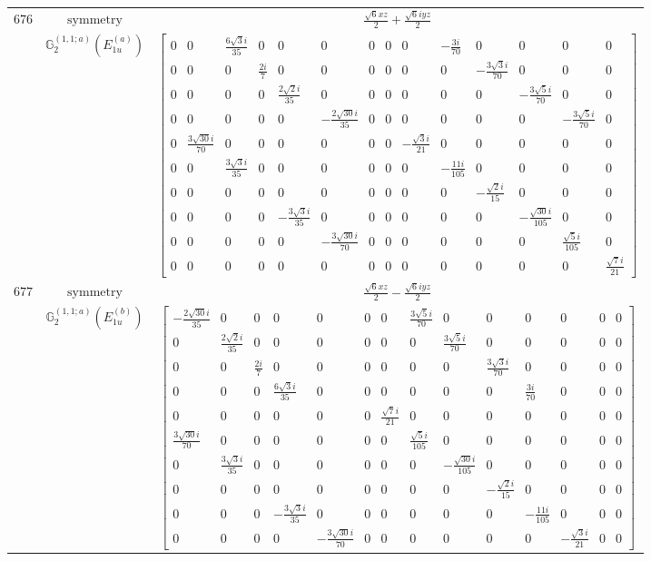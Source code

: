 \documentclass[fleqn,8pt,landscape]{jsarticle}
\begin{document}
\begin{longtable}{ccc}
$ 676 $ & $ \text{symmetry} $ & $ \frac{\sqrt{6} x z}{2} + \frac{\sqrt{6} i y z}{2} $ \\
$  $ & $ \mathbb{G}_{2}^{(1,1;a)}(E_{1u}^{(a)}) $ & $ \begin{bmatrix} 0 & 0 & \frac{6 \sqrt{3} i}{35} & 0 & 0 & 0 & 0 & 0 & 0 & - \frac{3 i}{70} & 0 & 0 & 0 & 0 \\ 0 & 0 & 0 & \frac{2 i}{7} & 0 & 0 & 0 & 0 & 0 & 0 & - \frac{3 \sqrt{3} i}{70} & 0 & 0 & 0 \\ 0 & 0 & 0 & 0 & \frac{2 \sqrt{2} i}{35} & 0 & 0 & 0 & 0 & 0 & 0 & - \frac{3 \sqrt{5} i}{70} & 0 & 0 \\ 0 & 0 & 0 & 0 & 0 & - \frac{2 \sqrt{30} i}{35} & 0 & 0 & 0 & 0 & 0 & 0 & - \frac{3 \sqrt{5} i}{70} & 0 \\ 0 & \frac{3 \sqrt{30} i}{70} & 0 & 0 & 0 & 0 & 0 & 0 & - \frac{\sqrt{3} i}{21} & 0 & 0 & 0 & 0 & 0 \\ 0 & 0 & \frac{3 \sqrt{3} i}{35} & 0 & 0 & 0 & 0 & 0 & 0 & - \frac{11 i}{105} & 0 & 0 & 0 & 0 \\ 0 & 0 & 0 & 0 & 0 & 0 & 0 & 0 & 0 & 0 & - \frac{\sqrt{2} i}{15} & 0 & 0 & 0 \\ 0 & 0 & 0 & 0 & - \frac{3 \sqrt{3} i}{35} & 0 & 0 & 0 & 0 & 0 & 0 & - \frac{\sqrt{30} i}{105} & 0 & 0 \\ 0 & 0 & 0 & 0 & 0 & - \frac{3 \sqrt{30} i}{70} & 0 & 0 & 0 & 0 & 0 & 0 & \frac{\sqrt{5} i}{105} & 0 \\ 0 & 0 & 0 & 0 & 0 & 0 & 0 & 0 & 0 & 0 & 0 & 0 & 0 & \frac{\sqrt{7} i}{21} \end{bmatrix} $ \\ \hline
$ 677 $ & $ \text{symmetry} $ & $ \frac{\sqrt{6} x z}{2} - \frac{\sqrt{6} i y z}{2} $ \\
$  $ & $ \mathbb{G}_{2}^{(1,1;a)}(E_{1u}^{(b)}) $ & $ \begin{bmatrix} - \frac{2 \sqrt{30} i}{35} & 0 & 0 & 0 & 0 & 0 & 0 & \frac{3 \sqrt{5} i}{70} & 0 & 0 & 0 & 0 & 0 & 0 \\ 0 & \frac{2 \sqrt{2} i}{35} & 0 & 0 & 0 & 0 & 0 & 0 & \frac{3 \sqrt{5} i}{70} & 0 & 0 & 0 & 0 & 0 \\ 0 & 0 & \frac{2 i}{7} & 0 & 0 & 0 & 0 & 0 & 0 & \frac{3 \sqrt{3} i}{70} & 0 & 0 & 0 & 0 \\ 0 & 0 & 0 & \frac{6 \sqrt{3} i}{35} & 0 & 0 & 0 & 0 & 0 & 0 & \frac{3 i}{70} & 0 & 0 & 0 \\ 0 & 0 & 0 & 0 & 0 & 0 & \frac{\sqrt{7} i}{21} & 0 & 0 & 0 & 0 & 0 & 0 & 0 \\ \frac{3 \sqrt{30} i}{70} & 0 & 0 & 0 & 0 & 0 & 0 & \frac{\sqrt{5} i}{105} & 0 & 0 & 0 & 0 & 0 & 0 \\ 0 & \frac{3 \sqrt{3} i}{35} & 0 & 0 & 0 & 0 & 0 & 0 & - \frac{\sqrt{30} i}{105} & 0 & 0 & 0 & 0 & 0 \\ 0 & 0 & 0 & 0 & 0 & 0 & 0 & 0 & 0 & - \frac{\sqrt{2} i}{15} & 0 & 0 & 0 & 0 \\ 0 & 0 & 0 & - \frac{3 \sqrt{3} i}{35} & 0 & 0 & 0 & 0 & 0 & 0 & - \frac{11 i}{105} & 0 & 0 & 0 \\ 0 & 0 & 0 & 0 & - \frac{3 \sqrt{30} i}{70} & 0 & 0 & 0 & 0 & 0 & 0 & - \frac{\sqrt{3} i}{21} & 0 & 0 \end{bmatrix} $ \\ \hline

\end{longtable}
\end{document}
